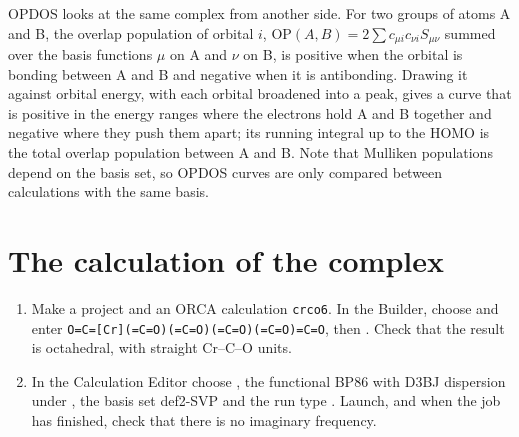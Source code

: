 OPDOS looks at the same complex from another side. For two groups of atoms A and B, the overlap population of orbital $i$, $\mathrm{OP}(A,B) = 2\sum c_{\mu i} c_{\nu i} S_{\mu\nu}$ summed over the basis functions $\mu$ on A and $\nu$ on B, is positive when the orbital is bonding between A and B and negative when it is antibonding. Drawing it against orbital energy, with each orbital broadened into a peak, gives a curve that is positive in the energy ranges where the electrons hold A and B together and negative where they push them apart; its running integral up to the HOMO is the total overlap population between A and B. Note that Mulliken populations depend on the basis set, so OPDOS curves are only compared between calculations with the same basis.

\section{The calculation of the complex}
\begin{enumerate}
	\item Make a project and an ORCA calculation \texttt{crco6}. In the Builder, choose  and enter \texttt{O=C=[Cr](=C=O)(=C=O)(=C=O)(=C=O)=C=O}, then . Check that the result is octahedral, with straight Cr--C--O units.
	\item In the Calculation Editor choose , the functional BP86 with D3BJ dispersion under , the basis set def2-SVP and the run type . Launch, and when the job has finished, check that there is no imaginary frequency.
\end{enumerate}

